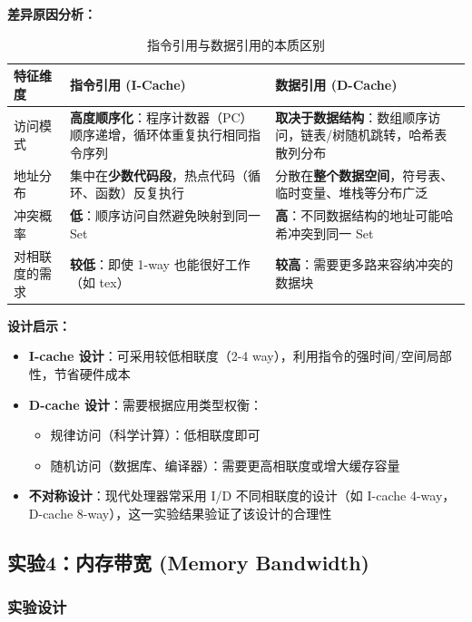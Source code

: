 \documentclass[12pt,a4paper]{article}
\begin{document}
\clearpage
\textbf{差异原因分析：}

\begin{table}[H]
\centering
\small
\caption{指令引用与数据引用的本质区别}
\begin{tabular}{p{3.5cm}p{5.5cm}p{5.5cm}}
\toprule
\textbf{特征维度} & \textbf{指令引用 (I-Cache)} & \textbf{数据引用 (D-Cache)} \\
\midrule
访问模式 & \textbf{高度顺序化}：程序计数器（PC）顺序递增，循环体重复执行相同指令序列 & \textbf{取决于数据结构}：数组顺序访问，链表/树随机跳转，哈希表散列分布 \\
\midrule
地址分布 & 集中在\textbf{少数代码段}，热点代码（循环、函数）反复执行 & 分散在\textbf{整个数据空间}，符号表、临时变量、堆栈等分布广泛 \\
\midrule
冲突概率 & \textbf{低}：顺序访问自然避免映射到同一 Set & \textbf{高}：不同数据结构的地址可能哈希冲突到同一 Set \\
\midrule
对相联度的需求 & \textbf{较低}：即使 1-way 也能很好工作（如 tex） & \textbf{较高}：需要更多路来容纳冲突的数据块 \\
\bottomrule
\end{tabular}
\end{table}

\textbf{设计启示：}

\begin{itemize}
    \item \textbf{I-cache 设计}：可采用较低相联度（2-4 way），利用指令的强时间/空间局部性，节省硬件成本
    \item \textbf{D-cache 设计}：需要根据应用类型权衡：
    \begin{itemize}
        \item 规律访问（科学计算）：低相联度即可
        \item 随机访问（数据库、编译器）：需要更高相联度或增大缓存容量
    \end{itemize}
    \item \textbf{不对称设计}：现代处理器常采用 I/D 不同相联度的设计（如 I-cache 4-way，D-cache 8-way），这一实验结果验证了该设计的合理性
\end{itemize}

\clearpage
\subsection{实验4：内存带宽 (Memory Bandwidth)}

\subsubsection{实验设计}
\end{document}
